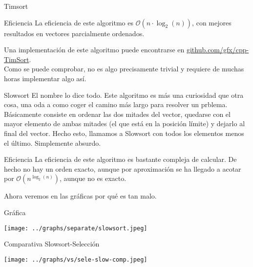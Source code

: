 \documentclass[compress]{beamer}
\begin{document}
\begin{frame}{Timsort}
	\begin{block}{Eficiencia}
	La eficiencia de este algoritmo es $\mathcal{O}(n\cdot\log_2(n))$, con mejores resultados en vectores parcialmente ordenados.
	\end{block}
\vspace{0.20in}
Una implementación de este algoritmo puede encontrarse en \href{https://github.com/gfx/cpp-TimSort}{github.com/gfx/cpp-TimSort}.\\
\vspace{0.20in}
Como se puede comprobar, no es algo precisamente trivial y requiere de muchas horas implementar algo así.
\end{frame}

\begin{frame}{Slowsort}
El nombre lo dice todo. Este algoritmo es más una curiosidad que otra cosa, una oda a como coger el camino más largo para resolver un prblema.\\
\vspace{0.20in}
Básicamente consiste en ordenar las dos mitades del vector, quedarse con el mayor elemento de ambas mitades (el que está en la posición límite) y dejarlo al final del vector. Hecho esto, llamamos a Slowsort con todos los elementos menos el último. Simplemente absurdo.\\
	\begin{block}{Eficiencia}
	La eficiencia de este algoritmo es bastante compleja de calcular. De hecho no hay un orden exacto, aunque por aproximación se ha llegado a acotar por $\mathcal{O}(n^{\log_2(n)})$, aunque no es exacto.
	\end{block}
Ahora veremos en las gráficas por qué es tan malo.
\end{frame}

\begin{frame}{Gráfica}
	\begin{alertblock}{}
		\begin{center}
		\texttt{[image: ../graphs/separate/slowsort.jpeg]}
		\end{center}
	\end{alertblock}
\end{frame}

\begin{frame}{Comparativa Slowsort-Selección}
	\begin{alertblock}{}
		\begin{center}
		\texttt{[image: ../graphs/vs/sele-slow-comp.jpeg]}
		\end{center}
	\end{alertblock}
\end{frame}
\end{document}
